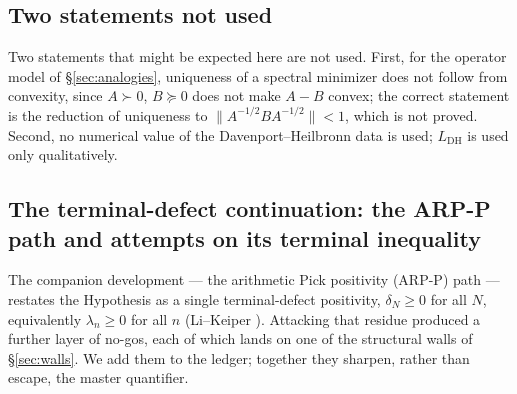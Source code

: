 \documentclass[11pt]{amsart}
\theoremstyle{definition}
\theoremstyle{remark}
\theoremstyle{definition}
\begin{document}
\subsection{Two statements not used}\label{sec:withdrawn}

Two statements that might be expected here are not used. First, for the operator model of
\S\ref{sec:analogies}, uniqueness of a spectral minimizer does not follow from convexity, since
$A\succ0$, $B\succeq0$ does not make $A-B$ convex; the correct statement is the reduction of uniqueness to
$\|A^{-1/2}BA^{-1/2}\|<1$, which is not proved. Second, no numerical value of the Davenport--Heilbronn data
is used; $L_{\mathrm{DH}}$ is used only qualitatively.

\subsection{The terminal-defect continuation: the ARP-P path and attempts on its terminal inequality}\label{sec:p52}

The companion development --- the arithmetic Pick positivity (ARP-P) path --- restates the Hypothesis as a
single terminal-defect positivity, $\delta_N\ge0$ for all $N$, equivalently $\lambda_n\ge0$ for all $n$
(Li--Keiper \cite{Li}). Attacking that residue produced a further layer of no-gos, each of which lands on
one of the structural walls of \S\ref{sec:walls}. We add them to the ledger; together they sharpen, rather
than escape, the master quantifier.
\end{document}
